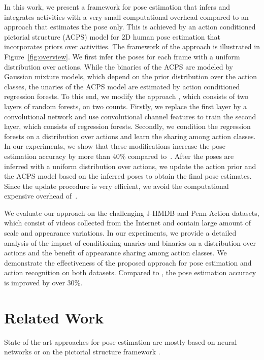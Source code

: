 \documentclass[a4paper, 10pt, conference]{ieeeconf}      \usepackage{FG2017}
\begin{document}
In this work, we present a framework for pose estimation that infers and integrates activities with a very small computational overhead compared to an approach that estimates the pose only. This is achieved by an action conditioned pictorial structure (ACPS) model for 2D human pose estimation that incorporates priors over activities. The framework of the approach is illustrated in Figure~\ref{fig:overview}. We first infer the poses for each frame with a uniform distribution over actions. 
While the binaries of the ACPS are modeled by Gaussian mixture models, which depend on the prior distribution over the action classes, the unaries of the ACPS model are estimated by action conditioned regression forests. To this end, we modify the approach \cite{dantone_tpami2014}, which consists of two layers of random forests, on two counts. Firstly, we replace the first layer by a convolutional network and use convolutional channel features to train the second layer, which consists of regression forests. Secondly, we condition the regression forests on a distribution over actions and learn the sharing among action classes. In our experiments, we show that these modifications increase the pose estimation accuracy by more than 40\% compared to~\cite{dantone_tpami2014}. After the poses are inferred with a uniform distribution over actions, we update the action prior and the ACPS model based on the inferred poses to obtain the final pose estimates. Since the update procedure is very efficient, we avoid the computational expensive overhead of~\cite{bruce_cvpr2015}. 


We evaluate our approach on the challenging J-HMDB \cite{Jhuang_iccv2013} and Penn-Action \cite{zhang2013actemes} datasets, which  consist of videos collected from the Internet and contain large amount of scale and appearance variations. In our experiments, we provide a detailed analysis of the impact of conditioning unaries and binaries on a distribution over actions and the benefit of appearance sharing among action classes.  We demonstrate the effectiveness of the proposed approach for pose estimation and action recognition on both datasets. Compared to \cite{bruce_cvpr2015}, the pose estimation accuracy is improved by over 30\%.



\section{Related Work}
State-of-the-art approaches for pose estimation are mostly based on neural networks \cite{toshev2014deeppose, tompson_cvpr2015, Pfister15a, wei2016cvpr, Pishchulin_2016_CVPR, rafi2016bmvc, georgia2016eccv} or on the pictorial structure framework \cite{yang_tpami2014,pishchulin_cvpr2013,dantone_tpami2014, dong2015iccv}.   
\end{document}
